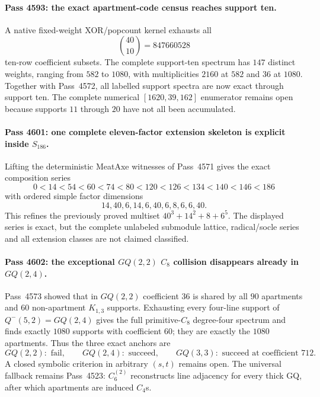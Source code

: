 \paragraph{Pass 4593: the exact apartment-code census reaches support ten.}
A native fixed-weight XOR/popcount kernel exhausts all
\[
 \binom{40}{10}=847660528
\]
ten-row coefficient subsets.  The complete support-ten spectrum has $147$
distinct weights, ranging from $582$ to $1080$, with multiplicities $2160$ at
$582$ and $36$ at $1080$.  Together with Pass~4572, all labelled support
spectra are now exact through support ten.  The complete numerical
$[1620,39,162]$ enumerator remains open because supports $11$ through $20$ have
not all been accumulated.

\paragraph{Pass 4601: one complete eleven-factor extension skeleton is explicit inside $S_{186}$.}
Lifting the deterministic MeatAxe witnesses of Pass~4571 gives the exact
composition series
\[
 \boxed{0<14<54<60<74<80<120<126<134<140<146<186}
\]
with ordered simple factor dimensions
\[
 \boxed{14,40,6,14,6,40,6,8,6,6,40.}
\]
This refines the previously proved multiset $40^3+14^2+8+6^5$.  The displayed
series is exact, but the complete unlabeled submodule lattice, radical/socle
series and all extension classes are not claimed classified.

\paragraph{Pass 4602: the exceptional $GQ(2,2)$ $C_8$ collision disappears already in $GQ(2,4)$.}
Pass~4573 showed that in $GQ(2,2)$ coefficient $36$ is shared by all $90$
apartments and $60$ non-apartment $K_{1,3}$ supports.  Exhausting every
four-line support of $Q^-(5,2)=GQ(2,4)$ gives the full primitive-$C_8$
degree-four spectrum and finds exactly $1080$ supports with coefficient $60$;
they are exactly the $1080$ apartments.  Thus the three exact anchors are
\[
 GQ(2,2):\text{ fail},\qquad GQ(2,4):\text{ succeed},\qquad
 GQ(3,3):\text{ succeed at coefficient }712.
\]
A closed symbolic criterion in arbitrary $(s,t)$ remains open.  The universal
fallback remains Pass~4523: $C_6^{(2)}$ reconstructs line adjacency for every
thick GQ, after which apartments are induced $C_4$s.

